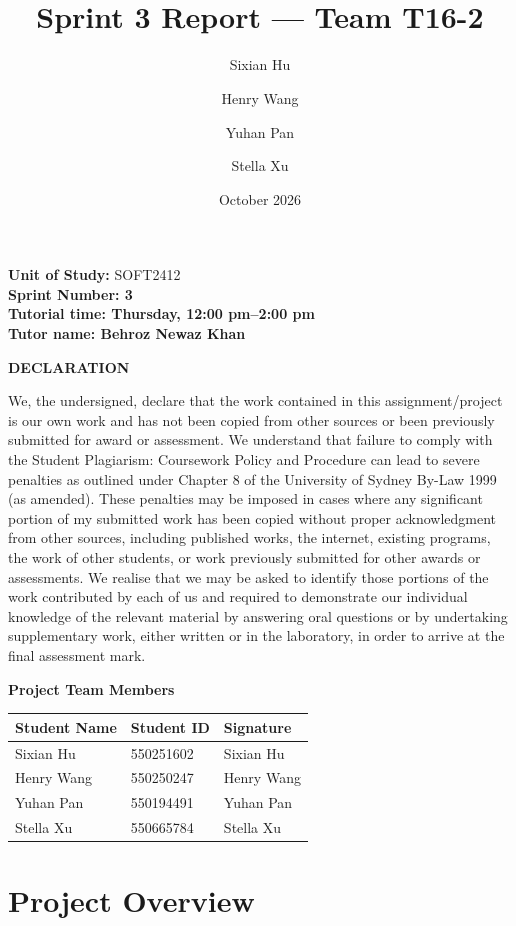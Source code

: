 \documentclass[a4paper,11pt]{article}
\title{\coursename\\[4pt]\large Sprint 3 Report --- Team T16-2}
\author{Sixian Hu \and Henry Wang \and Yuhan Pan \and Stella Xu}
\date{October 2026}
\begin{document}
\maketitle
\thispagestyle{empty}
\noindent\textbf{Unit of Study:} SOFT2412 \\
\noindent\textbf{Sprint Number: 3} \\
\noindent\textbf{Tutorial time: Thursday, 12:00 pm--2:00 pm } \\
\noindent\textbf{Tutor name: Behroz Newaz Khan}

\noindent\textbf{DECLARATION}

We, the undersigned, declare that the work contained in this assignment/project is our own work and has not been copied from other sources or been previously submitted for award or assessment. We understand that failure to comply with the Student Plagiarism: Coursework Policy and Procedure can lead to severe penalties as outlined under Chapter 8 of the University of Sydney By-Law 1999 (as amended). These penalties may be imposed in cases where any significant portion of my submitted work has been copied without proper acknowledgment from other sources, including published works, the internet, existing programs, the work of other students, or work previously submitted for other awards or assessments. We realise that we may be asked to identify those portions of the work contributed by each of us and required to demonstrate our individual knowledge of the relevant material by answering oral questions or by undertaking supplementary work, either written or in the laboratory, in order to arrive at the final assessment mark.

\vspace{1em}
\textbf{Project Team Members}

\begin{longtable}{|p{5cm}|p{4cm}|p{5cm}|}
\hline
\textbf{Student Name} & \textbf{Student ID} & \textbf{Signature} \\
\hline
Sixian Hu & 550251602 & Sixian Hu\\
\hline
Henry Wang & 550250247 & Henry Wang \\
\hline
Yuhan Pan & 550194491 & Yuhan Pan \\
\hline
Stella Xu & 550665784 & Stella Xu \\
\hline
\end{longtable}

\newpage
\section{Project Overview}
\end{document}
